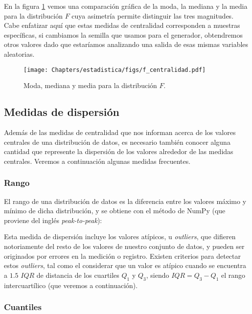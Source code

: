 
En la figura \ref{fig:estad01} vemos una comparación gráfica de la moda, la mediana y la media para la distribución $F$ cuya asimetría permite distinguir las tres magnitudes. Cabe enfatizar aquí que estas medidas de centralidad corresponden a muestras específicas, si cambiamos la semilla que usamos para el generador, obtendremos otros valores dado que estaríamos analizando una salida de esas mismas variables aleatorias.

\begin{figure}[t]
 \centering
 \texttt{[image: Chapters/estadistica/figs/f\_centralidad.pdf]}
 \caption{Moda, mediana y media para la distribución $F$.}
 \label{fig:estad01}
\end{figure}


\subsection{Medidas de dispersión}

Además de las medidas de centralidad que nos informan acerca de los valores centrales de una distribución de datos, es necesario también conocer alguna cantidad que represente la dispersión de los valores alrededor de las medidas centrales. Veremos a continuación algunas medidas frecuentes.

\subsubsection{Rango}

El rango de una distribución de datos es la diferencia entre los valores máximo y mínimo de dicha distribución, y se obtiene con el método  de NumPy (que proviene del inglés \textit{peak-to-peak}):


Esta medida de dispersión incluye los valores atípicos, u \textit{outliers}, que difieren notoriamente del resto de los valores de nuestro conjunto de datos, y pueden ser originados por errores en la medición o registro. Existen criterios para detectar estos \textit{outliers}, tal como el considerar que un valor es atípico cuando se encuentra a $1.5$ $IQR$ de distancia de los cuartiles $Q_1$ y $Q_3$, siendo $IQR = Q_3 - Q_1$ el rango intercuartílico (que veremos a continuación).

\subsubsection{Cuantiles}\label{sec:est-cuantiles}

